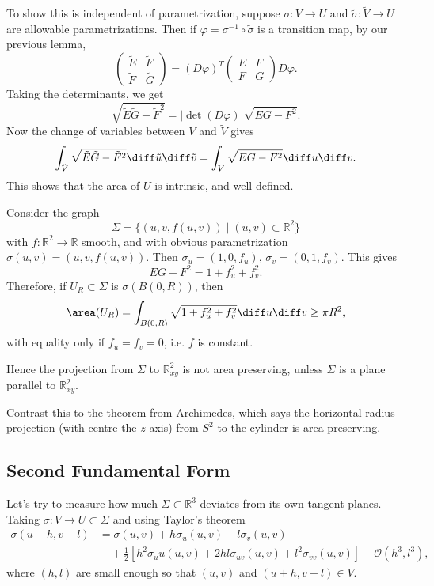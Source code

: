 \documentclass[12pt]{article}
\begin{document}
To show this is independent of parametrization, suppose $\sigma : V \to U$ and $\tilde \sigma : \tilde V \to U$ are allowable parametrizations. Then if $\varphi = \sigma^{-1} \circ \tilde \sigma$ is a transition map, by our previous lemma,
\[
\begin{pmatrix}
	\tilde E & \tilde F \\
	\tilde F & \tilde G
\end{pmatrix}
 = (D \varphi)^{T}
 \begin{pmatrix}
	 E & F \\
	 F & G
 \end{pmatrix}
 D \varphi
.\]
Taking the determinants, we get
\[
	\sqrt{\tilde E \tilde G - \tilde F^2} = |\det (D \varphi)| \sqrt{EG - F^2}
.\]
Now the change of variables between $V$ and $\tilde V$ gives
\[
	\int_{\tilde V} \sqrt{\tilde E \tilde G - \tilde F^2} \diff \tilde u \diff \tilde v = \int_{V} \sqrt{EG - F^2} \diff u \diff v
.\]
This shows that the area of $U$ is intrinsic, and well-defined.

\begin{exbox}
	Consider the graph
	\[
		\Sigma = \{(u, v, f(u, v)) \mid (u, v) \subset \mathbb{R}^2\}
	\]
	with $f : \mathbb{R}^2 \to \mathbb{R}$ smooth, and with obvious parametrization $\sigma(u, v) = (u, v, f(u, v))$. Then $\sigma_u = (1, 0, f_u)$, $\sigma_v = (0, 1, f_v)$. This gives
	\[
	EG - F^2 = 1 + f_u^2 + f_v^2
	.\]
	Therefore, if $U_R \subset \Sigma$ is $\sigma(B(0,R))$, then
	\[
		\area(U_R) = \int_{B(0,R)} \sqrt{1 + f_u^2 + f_v^2} \diff u \diff v \geq \pi R^2
	,\]
	with equality only if $f_u = f_v = 0$, i.e. $f$ is constant.

	Hence the projection from $\Sigma$ to $\mathbb{R}^2_{xy}$ is not area preserving, unless $\Sigma$ is a plane parallel to $\mathbb{R}^2_{xy}$.
\end{exbox}

Contrast this to the theorem from Archimedes, which says the horizontal radius projection (with centre the $z$-axis) from $S^2$ to the cylinder is area-preserving.

\subsection{Second Fundamental Form}
\label{sub:second_fundamental_form}

Let's try to measure how much $\Sigma \subset \mathbb{R}^3$ deviates from its own tangent planes. Taking $\sigma : V \to U \subset \Sigma$ and using Taylor's theorem
\begin{align*}
	\sigma(u+h, v+l) &= \sigma(u, v) + h \sigma_u(u, v) + l \sigma_v(u, v)  \\
			 &\quad + \frac{1}{2} [ h^2 \sigma_uu(u,v) + 2hl \sigma_{uv}(u,v) + l^2\sigma_{vv}(u,v)] + \mathcal{O}(h^3, l^3),
\end{align*}
where $(h, l)$ are small enough so that $(u, v)$ and $(u+h, v+l) \in V$.
\end{document}
